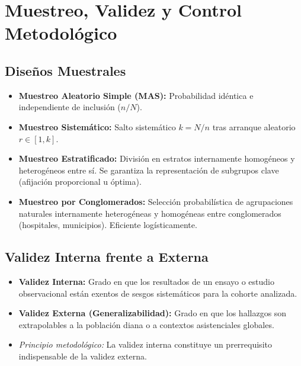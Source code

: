 \documentclass[11pt,a4paper]{report}
\theoremstyle{definition}
\begin{document}
\newpage
\chapter{Muestreo, Validez y Control Metodológico}

\section{Diseños Muestrales}
\begin{itemize}[leftmargin=*]
    \item \textbf{Muestreo Aleatorio Simple (MAS):} Probabilidad idéntica e independiente de inclusión ($n/N$).
    \item \textbf{Muestreo Sistemático:} Salto sistemático $k = N/n$ tras arranque aleatorio $r \in [1, k]$.
    \item \textbf{Muestreo Estratificado:} División en estratos internamente homogéneos y heterogéneos entre sí. Se garantiza la representación de subgrupos clave (afijación proporcional u óptima).
    \item \textbf{Muestreo por Conglomerados:} Selección probabilística de agrupaciones naturales internamente heterogéneas y homogéneas entre conglomerados (hospitales, municipios). Eficiente logísticamente.
\end{itemize}

\section{Validez Interna frente a Externa}
\begin{itemize}[leftmargin=*]
    \item \textbf{Validez Interna:} Grado en que los resultados de un ensayo o estudio observacional están exentos de sesgos sistemáticos para la cohorte analizada.
    \item \textbf{Validez Externa (Generalizabilidad):} Grado en que los hallazgos son extrapolables a la población diana o a contextos asistenciales globales.
    \item \emph{Principio metodológico:} La validez interna constituye un prerrequisito indispensable de la validez externa.
\end{itemize}
\end{document}
